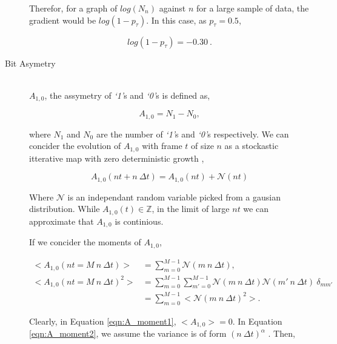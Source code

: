 \begin{description}
					Therefor, for a graph of $log(N_n)$ against $n$ for a large sample of data, the gradient would be $log(1 - p_\tau)$.
					In this case, as $p_\tau = 0.5$, 

					\begin{equation}
						log(1 - p_\tau) = -0.30\ .
						\label{eqn:log_chain_length_gradient}			
					\end{equation}

				\item[Bit Asymetry] \hfill \\
					
					$A_{1,0}$, the assymetry of \textit{`1'}s and \textit{`0'}s is defined as,

					\begin{equation}
						A_{1,0} = N_1 - N_0,
						\label{eqn:a_def}
					\end{equation}

					where $N_1$ and $N_0$ are the number of \textit{`1'}s and \textit{`0'}s respectively.
					We can concider the evolution of $A_{1,0}$ with frame $t$ of size $n$ as a stockastic itterative map with zero deterministic growth \cite{ref:stockastic_physics},

					\begin{equation}
						A_{1,0}(nt + n\ \Delta t) = A_{1,0}(nt) + \mathcal{N}(nt)
					\end{equation}

					Where $\mathcal{N}$ is an independant random variable picked from a gausian distribution. While $A_{1,0}(t) \in \mathbb{Z}$, in the limit of large $nt$ we can approximate that $A_{1,0}$ is continious. 
					\par
					If we concider the moments of $A_{1,0}$,

					\begin{align}
						\label{eqn:A_moment1}
						<A_{1,0}(nt = M\ n\ \Delta t)> & = \sum_{m = 0}^{M -1}  \mathcal{N}(m\ n\ \Delta t), \\
						\label{eqn:A_moment2}
						<A_{1,0}(nt = M\ n\ \Delta t)^2> & = \sum_{m=0}^{M-1} \sum_{m'=0}^{M-1}  \mathcal{N}(m\ n\ \Delta t) \mathcal{N}(m'\ n\ \Delta t)\ \delta_{mm'} \nonumber \\
						&= \sum_{m=0}^{M-1} < \mathcal{N}(m\ n\ \Delta t)^2 >.
					\end{align}

					Clearly, in Equation \ref{eqn:A_moment1}, $<A_{1,0}> = 0$. In Equation \ref{eqn:A_moment2}, we assume the variance is of form $(n\ \Delta t)^\alpha$ \cite{ref:stockastic_physics}. Then,


\end{description}
